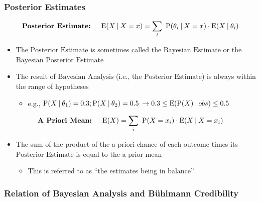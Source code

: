 \documentclass[
]{article}
\providecommand{\tightlist}{%
  \setlength{\itemsep}{0pt}\setlength{\parskip}{0pt}}
\begin{document}
\begin{red}

\hypertarget{posterior-estimates}{%
\subsubsection{Posterior Estimates}\label{posterior-estimates}}

\[
  \textbf{Posterior Estimate: } \quad \text{E}(X \:\vert\: X = x) =\sum_i \ \text{P}(\theta_i \:\vert\: X=x) \cdot \text{E}(X  \:\vert\: \theta_i)
\]

\begin{itemize}
\item
  The \(\text{Posterior Estimate}\) is sometimes called the
  \(\text{Bayesian Estimate}\) or the
  \(\text{Bayesian Posterior Estimate}\)
\item
  The result of \(\text{Bayesian Analysis}\) (i.e., the
  \(\text{Posterior Estimate}\)) is always within the range of
  hypotheses

  \begin{itemize}
  \tightlist
  \item
    e.g.,
    \(\text{P}(X \:\vert\: \theta_1) = 0.3; \text{P}(X \:\vert\: \theta_2) = 0.5\)
    \(\rightarrow 0.3\le \text{E}(\text{P}(X) \:\vert\: obs) \le 0.5\)
  \end{itemize}
\end{itemize}

\end{red}

\begin{red}

\[
  \textbf{A Priori Mean: } \quad \text{E}(X) = \sum_i \  \text{P}(X = x_i) \cdot \text{E}(X \:\vert\: X = x_i)
\]

\begin{itemize}
\item
  The sum of the product of the a priori chance of each outcome times
  its \(\text{Posterior Estimate}\) is equal to the a prior mean

  \begin{itemize}
  \tightlist
  \item
    This is referred to as ``the estimates being in balance''
  \end{itemize}
\end{itemize}

\end{red}

\hypertarget{relation-of-bayesian-analysis-and-buxfchlmann-credibility}{%
\subsubsection{Relation of Bayesian Analysis and Bühlmann
Credibility}\label{relation-of-bayesian-analysis-and-buxfchlmann-credibility}}
\end{document}
